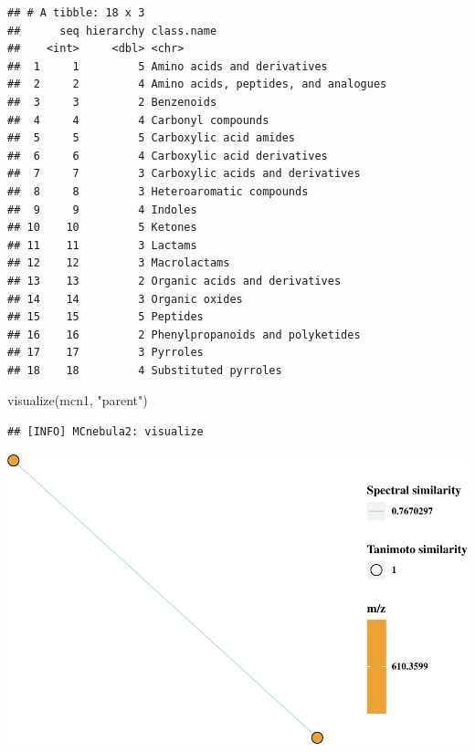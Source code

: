 \documentclass[
]{article}
\newenvironment{Shaded}{\begin{snugshade}}{\end{snugshade}}
\newcommand{\FunctionTok}[1]{\textcolor[rgb]{0.00,0.00,0.00}{#1}}
\newcommand{\NormalTok}[1]{#1}
\newcommand{\StringTok}[1]{\textcolor[rgb]{0.31,0.60,0.02}{#1}}
\begin{document}
\begin{verbatim}
## # A tibble: 18 x 3
##      seq hierarchy class.name                          
##    <int>     <dbl> <chr>                               
##  1     1         5 Amino acids and derivatives         
##  2     2         4 Amino acids, peptides, and analogues
##  3     3         2 Benzenoids                          
##  4     4         4 Carbonyl compounds                  
##  5     5         5 Carboxylic acid amides              
##  6     6         4 Carboxylic acid derivatives         
##  7     7         3 Carboxylic acids and derivatives    
##  8     8         3 Heteroaromatic compounds            
##  9     9         4 Indoles                             
## 10    10         5 Ketones                             
## 11    11         3 Lactams                             
## 12    12         3 Macrolactams                        
## 13    13         2 Organic acids and derivatives       
## 14    14         3 Organic oxides                      
## 15    15         5 Peptides                            
## 16    16         2 Phenylpropanoids and polyketides    
## 17    17         3 Pyrroles                            
## 18    18         4 Substituted pyrroles
\end{verbatim}

\begin{Shaded}
\begin{Highlighting}[]
\FunctionTok{visualize}\NormalTok{(mcn1, }\StringTok{"parent"}\NormalTok{)}
\end{Highlighting}
\end{Shaded}

\begin{verbatim}
## [INFO] MCnebula2: visualize
\end{verbatim}

\includegraphics{Rtips2_files/figure-latex/unnamed-chunk-12-1.pdf}
\end{document}
